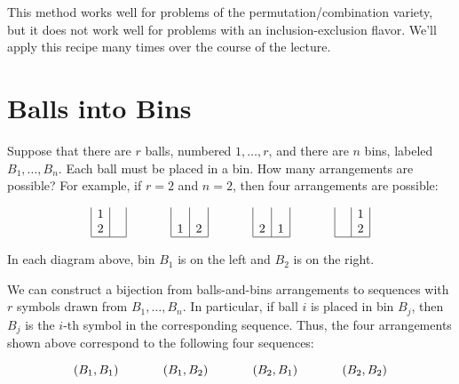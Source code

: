 \documentclass[twoside,12pt]{article}
\begin{document}
\noindent This method works well for problems of the
permutation/combination variety, but it does not work well for
problems with an inclusion-exclusion flavor.  We'll apply this recipe
many times over the course of the lecture.

\section{Balls into Bins}

Suppose that there are $r$ balls, numbered $1, \ldots, r$, and there
are $n$ bins, labeled $B_1, \ldots, B_n$.  Each ball must be placed in
a bin.  How many arrangements are possible?  For example, if $r = 2$
and $n = 2$, then four arrangements are possible:

\[
\begin{array}{|c|c|}
1 & \ \\
2 & \\ \hline
\end{array}
\hspace{0.5in}
\begin{array}{|c|c|}
  &   \\
1 & 2 \\ \hline
\end{array}
\hspace{0.5in}
\begin{array}{|c|c|}
  &   \\
2 & 1 \\ \hline
\end{array}
\hspace{0.5in}
\begin{array}{|c|c|}
\ & 1 \\
  & 2 \\ \hline
\end{array}
\]

\noindent In each diagram above, bin $B_1$ is on the left and $B_2$ is
on the right.

We can construct a bijection from balls-and-bins arrangements to
sequences with $r$ symbols drawn from $B_1, \ldots, B_n$.  In
particular, if ball $i$ is placed in bin $B_j$, then $B_j$ is the
$i$-th symbol in the corresponding sequence.  Thus, the four
arrangements shown above correspond to the following four sequences:

\[
(B_1, B_1) \hspace{0.5in}
(B_1, B_2) \hspace{0.5in}
(B_2, B_1) \hspace{0.5in}
(B_2, B_2)
\]
\end{document}
